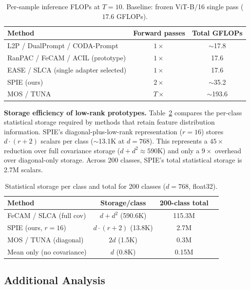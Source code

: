 \begin{table}[h]
\centering
\caption{Per-sample inference FLOPs at $T=10$. Baseline: frozen ViT-B/16 single pass ($17.6$ GFLOPs).}
\label{tab:flops}
\small
\begin{tabular}{lcc}
\toprule
Method & Forward passes & Total GFLOPs \\
\midrule
L2P / DualPrompt / CODA-Prompt & $1\times$ & $\sim$17.8 \\
RanPAC / FeCAM / ACIL (prototype) & $1\times$ & 17.6 \\
EASE / SLCA (single adapter selected) & $1\times$ & 17.6 \\
SPIE (ours)                           & $2\times$ & $\sim$35.2 \\
MOS / TUNA                            & $T\times$ & $\sim$193.6 \\
\bottomrule
\end{tabular}
\end{table}

\noindent\textbf{Storage efficiency of low-rank prototypes.}
Table~\ref{tab:storage_proto} compares the per-class statistical storage required by methods that retain feature distribution information. SPIE's diagonal-plus-low-rank representation ($r=16$) stores $d \cdot (r+2)$ scalars per class ($\sim$13.1K at $d=768$). This represents a $45\times$ reduction over full covariance storage ($d+d^2 \approx 590$K) and only a $9\times$ overhead over diagonal-only storage. Across 200 classes, SPIE's total statistical storage is 2.7M scalars.

\begin{table}[h]
\centering
\caption{Statistical storage per class and total for 200 classes ($d=768$, float32).}
\label{tab:storage_proto}
\small
\begin{tabular}{lccc}
\toprule
Method & Storage/class & 200-class total \\
\midrule
FeCAM / SLCA (full cov)       & $d + d^2$ (590.6K)    & 115.3M \\
SPIE (ours, $r=16$)           & $d \cdot (r+2)$ (13.8K) & 2.7M  \\
MOS / TUNA (diagonal)         & $2d$ (1.5K)           & 0.3M  \\
Mean only (no covariance)     & $d$ (0.8K)            & 0.15M \\
\bottomrule
\end{tabular}
\end{table}

\subsection{Additional Analysis}
\label{sec:analysis}

